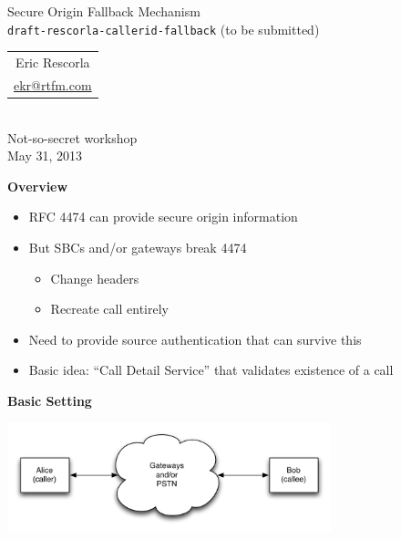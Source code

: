 \documentclass[helvetica]{seminar}
\newcommand{\heading}[1]{%
  \begin{center} 
    \large\bf 
    #1 
  \end{center} 
  \vspace{.4 in}}
\begin{document}
\centerslidestrue

\begin{slide}
\begin{center}
\vspace{1 in}
\LARGE{{\bf}Secure Origin Fallback Mechanism\\
\texttt{draft-rescorla-callerid-fallback} (to be submitted)}\\
\vspace{2em}
\large{
\begin{tabular}{c}
Eric Rescorla \\
\url{ekr@rtfm.com}
\end{tabular}
}\\
\vspace{3em}
\large{Not-so-secret workshop}\\
\large{May 31, 2013}\\
\end{center}

\end{slide}

\centerslidesfalse


\begin{slide}
\heading{Overview}

\begin{itemize}
\item RFC 4474 can provide secure origin information
\item But SBCs and/or gateways break 4474
  \begin{itemize}
  \item Change headers
  \item Recreate call entirely
  \end{itemize}
\item Need to provide source authentication that can survive this
\item Basic idea: ``Call Detail Service'' that validates existence of a call
\end{itemize}

\end{slide}



\begin{slide}
\heading{Basic Setting}

\begin{center}
\includegraphics[width=3.7in]{setting1}
\end{center}
\end{slide}
\end{document}
